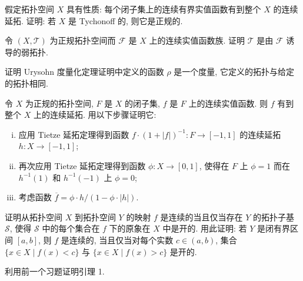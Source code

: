 \documentclass[../../main.tex]{subfiles}
\begin{document}
\begin{exercise}\label{exercise:ch12-05}
假定拓扑空间 $X$ 具有性质: 每个闭子集上的连续有界实值函数有到整个 $X$ 的连续延拓. 证明: 若 $X$ 是 Tychonoff 的, 则它是正规的.
\end{exercise}

\begin{exercise}\label{exercise:ch12-06}
令 $(X,\mathcal{T})$ 为正规拓扑空间而 $\mathcal{F}$ 是 $X$ 上的连续实值函数族. 证明 $\mathcal{T}$ 是由 $\mathcal{F}$ 诱导的弱拓扑.
\end{exercise}

\begin{exercise}\label{exercise:ch12-07}
证明 Urysohn 度量化定理证明中定义的函数 $\rho$ 是一个度量, 它定义的拓扑与给定的拓扑相同.
\end{exercise}

\begin{exercise}\label{exercise:ch12-08}
令 $X$ 为正规的拓扑空间, $F$ 是 $X$ 的闭子集, $f$ 是 $F$ 上的连续实值函数. 则 $f$ 有到整个 $X$ 上的连续延拓. 用以下步骤证明它:
\begin{enumerate}[(i)]
\item 应用 Tietze 延拓定理得到函数 $f\cdot(1+|f|)^{-1}:F\to[-1,1]$ 的连续延拓 $h:X\to[-1,1]$;
\item 再次应用 Tietze 延拓定理得到函数 $\phi:X\to[0,1]$, 使得在 $F$ 上 $\phi=1$ 而在 $h^{-1}(1)$ 和 $h^{-1}(-1)$ 上 $\phi=0$;
\item 考虑函数 $\overline{f}=\phi\cdot h/(1-\phi\cdot|h|)$.
\end{enumerate}
\end{exercise}

\begin{exercise}\label{exercise:ch12-09}
证明从拓扑空间 $X$ 到拓扑空间 $Y$ 的映射 $f$ 是连续的当且仅当存在 $Y$ 的拓扑子基 $\mathcal{S}$, 使得 $\mathcal{S}$ 中的每个集合在 $f$ 下的原象在 $X$ 中是开的. 用此证明: 若 $Y$ 是闭有界区间 $[a,b]$, 则 $f$ 是连续的, 当且仅当对每个实数 $c\in(a,b)$, 集合 $\{x\in X\mid f(x)<c\}$ 与 $\{x\in X\mid f(x)>c\}$ 是开的.
\end{exercise}

\begin{exercise}\label{exercise:ch12-10}
利用前一个习题证明引理 1.
\end{exercise}
\end{document}
